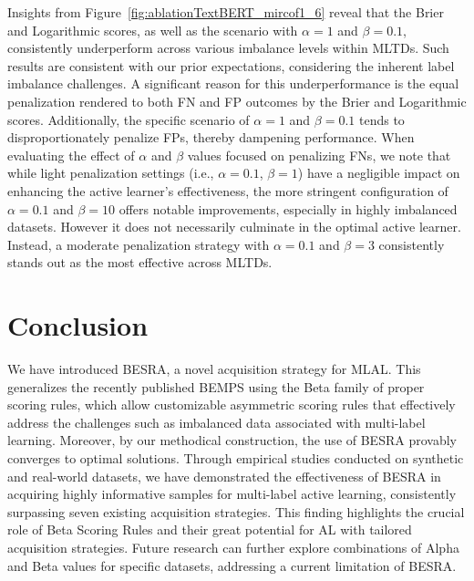 \documentclass[letterpaper]{article} %
\begin{document}
Insights from Figure~\ref{fig:ablationTextBERT_mircof1_6} reveal that the Brier and Logarithmic scores, as well as the scenario with $\alpha=1$ and $\beta=0.1$, consistently underperform across various imbalance levels within MLTDs. 
Such results are consistent with our prior expectations, considering the inherent label imbalance challenges.  
A significant reason for this underperformance is the equal penalization rendered to both FN and FP outcomes by the Brier and Logarithmic scores. Additionally, the specific scenario of $\alpha=1$ and $\beta=0.1$ tends to disproportionately penalize FPs, thereby dampening performance. When evaluating the effect of $\alpha$ and $\beta$ values focused on penalizing FNs, we note that while light penalization settings (i.e., $\alpha=0.1$, $\beta=1$) have a negligible impact on enhancing the active learner's effectiveness, the more stringent configuration of $\alpha=0.1$ and $\beta=10$ offers notable improvements, especially in highly imbalanced datasets. However it does not necessarily culminate in the optimal active learner.
Instead, a moderate penalization strategy with $\alpha=0.1$ and $\beta=3$ consistently stands out as the most effective across MLTDs.







\section{Conclusion}

We have introduced BESRA, a novel acquisition strategy for MLAL.
This generalizes the recently published BEMPS using the Beta family of proper scoring rules,
which allow customizable asymmetric scoring rules
that effectively address the challenges such as imbalanced data associated with multi-label learning.
Moreover, by our methodical construction, the use of BESRA provably converges to optimal solutions.
Through empirical studies conducted on synthetic and real-world datasets, we have demonstrated  
the effectiveness of BESRA in acquiring highly informative samples for multi-label active learning, 
consistently surpassing seven existing acquisition strategies.   
This finding highlights the crucial role of Beta Scoring Rules and their great potential for AL with tailored acquisition strategies.
Future research can further explore combinations of Alpha and Beta values for specific datasets, addressing a current limitation of BESRA.







\end{document}
